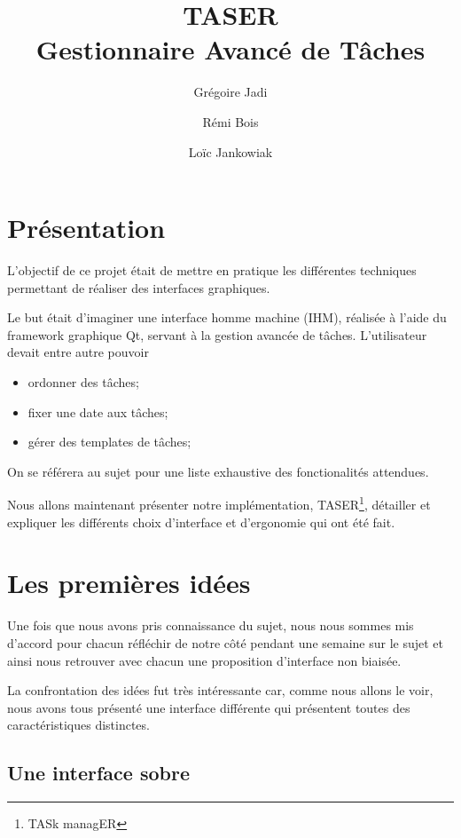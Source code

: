 \documentclass[11pt]{article}
\author{Grégoire Jadi \and{} Rémi Bois \and{} Loïc Jankowiak}
\title{TASER \\
Gestionnaire Avancé de Tâches}
\begin{document}
\maketitle
\tableofcontents


\section{Présentation}

L'objectif de ce projet était de mettre en pratique les différentes
techniques permettant de réaliser des interfaces graphiques.

Le but était d'imaginer une interface homme machine (IHM), réalisée à
l'aide du framework graphique Qt, servant à la gestion avancée de
tâches. L'utilisateur devait entre autre pouvoir
\begin{itemize}
\item ordonner des tâches;
\item fixer une date aux tâches;
\item gérer des templates de tâches;
\end{itemize}
On se référera au sujet pour une liste exhaustive des fonctionalités
attendues.

Nous allons maintenant présenter notre implémentation,
TASER\footnote{TASk managER}, détailler et expliquer les différents
choix d'interface et d'ergonomie qui ont été fait.


\section{Les premières idées}

Une fois que nous avons pris connaissance du sujet, nous nous sommes
mis d'accord pour chacun réfléchir de notre côté pendant une semaine
sur le sujet et ainsi nous retrouver avec chacun une proposition
d'interface non biaisée.

La confrontation des idées fut très intéressante car, comme nous
allons le voir, nous avons tous présenté une interface différente qui
présentent toutes des caractéristiques distinctes.



\subsection{Une interface sobre}
\end{document}
